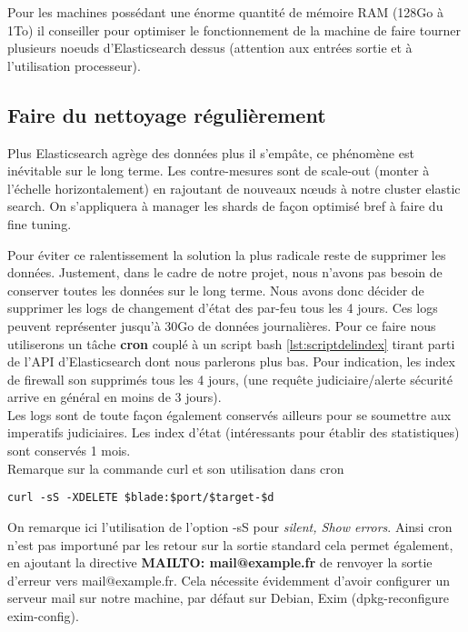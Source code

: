 Pour les machines possédant une énorme quantité de mémoire RAM (128Go à 1To)
il conseiller pour optimiser le fonctionnement de la machine de faire tourner plusieurs
noeuds d'Elasticsearch dessus (attention aux entrées sortie et à l'utilisation processeur).

\subsection{Faire du nettoyage régulièrement}
Plus Elasticsearch agrège des données plus il s'empâte, ce phénomène est inévitable 
sur le long terme. Les contre-mesures sont de scale-out (monter à l'échelle horizontalement)
en rajoutant de nouveaux nœuds à notre cluster elastic search. On s'appliquera à 
manager les shards de façon optimisé bref à faire du fine tuning.

Pour éviter ce ralentissement la solution la plus radicale reste de supprimer les 
données. Justement, dans le cadre de notre projet, nous n'avons pas besoin de conserver 
toutes les données sur le long terme. Nous avons donc décider de supprimer les logs 
de changement d'état des par-feu tous les 4 jours. Ces logs peuvent représenter 
jusqu'à 30Go de données journalières. 
Pour ce faire nous utiliserons un tâche \textbf{cron} couplé à un script bash 
\ref{lst:scriptdelindex} tirant parti de l'API d'Elasticsearch dont nous parlerons 
plus bas. Pour indication, les index de firewall son supprimés tous les 4 jours, 
(une requête judiciaire/alerte sécurité arrive en général en moins de 3 jours).\\ 
Les logs sont de toute façon également conservés ailleurs pour se soumettre aux 
imperatifs judiciaires. Les index d'état (intéressants pour établir des statistiques)
sont conservés 1 mois.\\
Remarque sur la commande curl et son utilisation dans cron

\begin{lstlisting}[style=code,label={lst:curlexemple},caption={Extrait de notre script \ref{lst:scriptdelindex}}]
curl -sS -XDELETE $blade:$port/$target-$d
\end{lstlisting}

On remarque ici l'utilisation de l'option -sS pour \textit{silent, Show errors}.
Ainsi cron n'est pas importuné par les retour sur la sortie standard cela permet
également, en ajoutant la directive \textbf{MAILTO: mail@example.fr} de renvoyer
la sortie d'erreur vers mail@example.fr. Cela nécessite évidemment d'avoir configurer
un serveur mail sur notre machine, par défaut sur Debian, Exim (dpkg-reconfigure 
exim-config).

